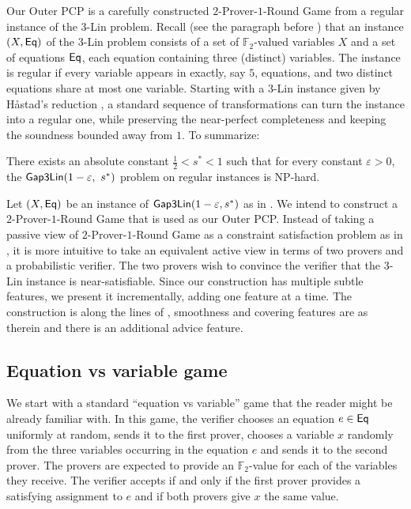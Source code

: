 \documentclass{toc}
\newcommand\eps{\varepsilon}
\begin{document}
Our Outer PCP is a carefully constructed $2$-Prover-$1$-Round Game from a regular instance of the $3$-Lin problem. Recall (see
the paragraph before ) that an instance $(X, {\sf Eq})$ of the $3$-Lin problem consists of a set of
${\mathbb F}_2$-valued variables $ X$ and a set of equations ${\sf Eq}$, each equation containing three (distinct) variables. The
instance is regular if  every variable appears in exactly, say $5$,
 equations, and two distinct equations share at most one variable.
 Starting with a $3$-Lin instance given by H\aa stad's reduction \cite{Has01}, a standard sequence of transformations can turn the
 instance into a regular one, while preserving the near-perfect completeness and keeping the soundness bounded away from $1$.
 To summarize:

 \begin{theorem}\label{thm:regular_3lin}
 There exists an absolute constant $\frac{1}{2} < s^* < 1 $ such that for every constant $\eps > 0$, the ${\sf Gap3Lin}(1-\eps, ~s^*)$
 problem on regular instances is NP-hard.
 \end{theorem}



Let $(X, {\sf Eq})$ be an instance of ${\sf Gap3Lin}(1-\eps, s^*)$ as in . We intend to construct a $2$-Prover-$1$-Round Game
that is used as our Outer PCP.  Instead
of taking a passive view of $2$-Prover-$1$-Round Game as a constraint satisfaction problem as in ,
it is more intuitive to take
an equivalent active view in terms of two provers and a probabilistic verifier. The two provers wish to convince the verifier that the $3$-Lin instance
is near-satisfiable. Since our construction has multiple subtle features, we present it incrementally, adding one feature at a time.
The construction is along the lines of \cite{KS}, smoothness and covering features are as therein and there is an additional
advice feature.



\subsection{Equation vs variable game}



We start with a standard ``equation vs variable'' game that the reader might be already familiar with. In this game,
the verifier chooses an equation $e\in {\sf Eq}$ uniformly at random, sends it to
the first prover, chooses a variable $x$ randomly from the three variables occurring in the equation $e$ and sends it to the second prover.
The provers are expected to provide an ${\mathbb F}_2$-value for each of the variables they receive.
The verifier accepts if and only if the first prover provides a satisfying assignment to $e$ and if
both provers give $x$ the same value.
\end{document}
